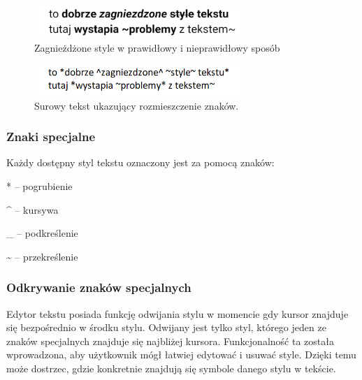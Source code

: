 \begin{figure}[ht]
    \centering
    \includegraphics[width=8cm]{images/style.png}
    \caption{Zagnieżdżone style w prawidłowy i nieprawidłowy sposób}
    \vspace{3mm}
\end{figure}

\begin{figure}[ht]
    \centering
    \includegraphics[width=8cm]{images/style_surowy_tekst.png}
    \caption{Surowy tekst ukazujący rozmieszczenie znaków.}
    \vspace{3mm}
\end{figure}

\subsubsection{Znaki specjalne}

Każdy dostępny styl tekstu oznaczony jest za pomocą znaków:

\begin{compactitem}
    
    \item [*] \hspace{1mm} -- pogrubienie
    \item [\^{}] \hspace{1mm} -- kursywa
    \item [\_{}] \hspace{1mm} -- podkreślenie
    \item [\~{}] \hspace{1mm} -- przekreślenie
\end{compactitem}

\subsubsection{Odkrywanie znaków specjalnych}

Edytor tekstu posiada funkcję odwijania stylu w momencie gdy kursor znajduje się bezpośrednio w środku stylu. Odwijany jest tylko styl, którego jeden ze znaków specjalnych znajduje się najbliżej kursora. Funkcjonalność ta została wprowadzona, aby użytkownik mógł łatwiej edytować i usuwać style.
Dzięki temu może dostrzec, gdzie konkretnie znajdują się symbole danego stylu w tekście.


